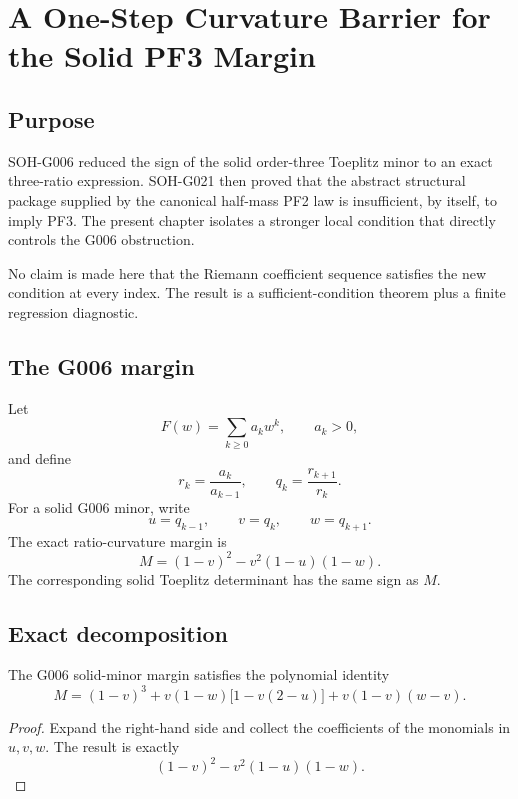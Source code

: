 \chapter{A One-Step Curvature Barrier for the Solid PF3 Margin}
\label{chap:g022-pf3-curvature-barrier}


\section{Purpose}

SOH-G006 reduced the sign of the solid order-three Toeplitz minor to an exact
three-ratio expression. SOH-G021 then proved that the abstract structural
package supplied by the canonical half-mass PF2 law is insufficient, by
itself, to imply PF3. The present chapter isolates a stronger local condition
that directly controls the G006 obstruction.

No claim is made here that the Riemann coefficient sequence satisfies the new
condition at every index. The result is a sufficient-condition theorem plus a
finite regression diagnostic.

\section{The G006 margin}

Let
\[
 F(w)=\sum_{k\ge0}a_k w^k,
 \qquad a_k>0,
\]
and define
\[
 r_k=\frac{a_k}{a_{k-1}},
 \qquad
 q_k=\frac{r_{k+1}}{r_k}.
\]
For a solid G006 minor, write
\[
 u=q_{k-1},\qquad v=q_k,\qquad w=q_{k+1}.
\]
The exact ratio-curvature margin is
\[
 M=(1-v)^2-v^2(1-u)(1-w).
\]
The corresponding solid Toeplitz determinant has the same sign as \(M\).

\section{Exact decomposition}

\begin{theorem}
The G006 solid-minor margin satisfies the polynomial identity
\[
 \boxed{
 M=(1-v)^3
 +v(1-w)\bigl[1-v(2-u)\bigr]
 +v(1-v)(w-v).
 }
\]
\end{theorem}

\begin{proof}
Expand the right-hand side and collect the coefficients of the monomials in
\(u,v,w\). The result is exactly
\[
 (1-v)^2-v^2(1-u)(1-w).
\]
\end{proof}

